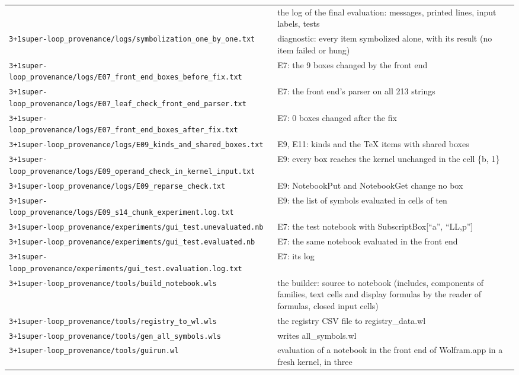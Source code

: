 \documentclass[
  10pt,
]{article}
\begin{document}
\begin{longtable}[]{@{}
  >{\raggedright\arraybackslash}p{}
  >{\raggedright\arraybackslash}p{}@{}}
& the log of the final evaluation: messages, printed lines, input
labels, tests \\
\texttt{3+1super-loop\_provenance/logs/symbolization\_one\_by\_one.txt}
& diagnostic: every item symbolized alone, with its result (no item
failed or hung) \\
\texttt{3+1super-loop\_provenance/logs/E07\_front\_end\_boxes\_before\_fix.txt}
& E7: the 9 boxes changed by the front end \\
\texttt{3+1super-loop\_provenance/logs/E07\_leaf\_check\_front\_end\_parser.txt}
& E7: the front end's parser on all 213 strings \\
\texttt{3+1super-loop\_provenance/logs/E07\_front\_end\_boxes\_after\_fix.txt}
& E7: 0 boxes changed after the fix \\
\texttt{3+1super-loop\_provenance/logs/E09\_kinds\_and\_shared\_boxes.txt}
& E9, E11: kinds and the TeX items with shared boxes \\
\texttt{3+1super-loop\_provenance/logs/E09\_operand\_check\_in\_kernel\_input.txt}
& E9: every box reaches the kernel unchanged in the cell \{b, 1\} \\
\texttt{3+1super-loop\_provenance/logs/E09\_reparse\_check.txt} & E9:
NotebookPut and NotebookGet change no box \\
\texttt{3+1super-loop\_provenance/logs/E09\_s14\_chunk\_experiment.log.txt}
& E9: the list of symbols evaluated in cells of ten \\
\texttt{3+1super-loop\_provenance/experiments/gui\_test.unevaluated.nb}
& E7: the test notebook with SubscriptBox{[}``a'', ``LL,p''{]} \\
\texttt{3+1super-loop\_provenance/experiments/gui\_test.evaluated.nb} &
E7: the same notebook evaluated in the front end \\
\texttt{3+1super-loop\_provenance/experiments/gui\_test.evaluation.log.txt}
& E7: its log \\
\texttt{3+1super-loop\_provenance/tools/build\_notebook.wls} & the
builder: source to notebook (includes, components of families, text
cells and display formulas by the reader of formulas, closed input
cells) \\
\texttt{3+1super-loop\_provenance/tools/registry\_to\_wl.wls} & the
registry CSV file to registry\_data.wl \\
\texttt{3+1super-loop\_provenance/tools/gen\_all\_symbols.wls} & writes
all\_symbols.wl \\
\texttt{3+1super-loop\_provenance/tools/guirun.wl} & evaluation of a
notebook in the front end of Wolfram.app in a fresh kernel, in three

\end{longtable}
\end{document}
